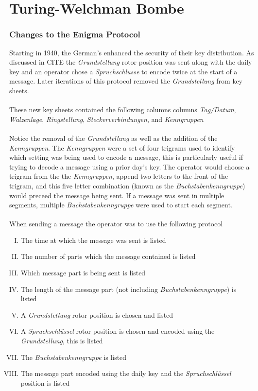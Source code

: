 

\chapter{Turing-Welchman Bombe}

\subsection{Changes to the Enigma Protocol}
Starting in 1940, the German's enhanced the security of their
key distribution. As discussed in CITE the \emph{Grundstellung} rotor
position was sent along with the daily key and an operator chose a
\emph{Spruchschlusse} to
encode twice at the start of a message. Later iterations of this
protocol removed the \emph{Grundstellung}
from key sheets.
\\\\These new key sheets contained the following columns
columns \emph{Tag/Datum}, \emph{Walzenlage}, \emph{Ringstellung},
\emph{Steckerverbindungen}, and \emph{Kenngruppen}
\\\\Notice the removal of the \emph{Grundstellung} as well as the
addition of the \emph{Kenngruppen}. The \emph{Kenngruppen} were a set of
four trigrams used to identify which setting was being used to encode
a message, this is particularly useful if trying to decode a message
using a prior day's key.
The operator would choose a trigram from the the \emph{Kenngruppen},
append two letters to the front of the trigram,
and this five letter combination (known as the
\emph{Buchstabenkenngruppe}) would preceed the message being sent. If a message
was sent in multiple segments, multiple \emph{Buchstabenkenngruppe}
were used to start each segment.
\\\\When sending a message the operator was to use the following protocol
\begin{enumerate}[I.]
  \item The time at which the message was sent is listed
  \item The number of parts which the message contained is listed
  \item Which message part is being sent is listed
  \item The length of the message part (not including
    \emph{Buchstabenkenngruppe}) is listed
  \item A \emph{Grundstellung} rotor position is chosen and listed
  \item A \emph{Spruchschlüssel} rotor position is chosen and encoded
    using the \emph{Grundstellung}, this is listed
  \item The \emph{Buchstabenkenngruppe} is listed
  \item The message part encoded using the daily key and the
    \emph{Spruchschlüssel} position is listed
\end{enumerate}
